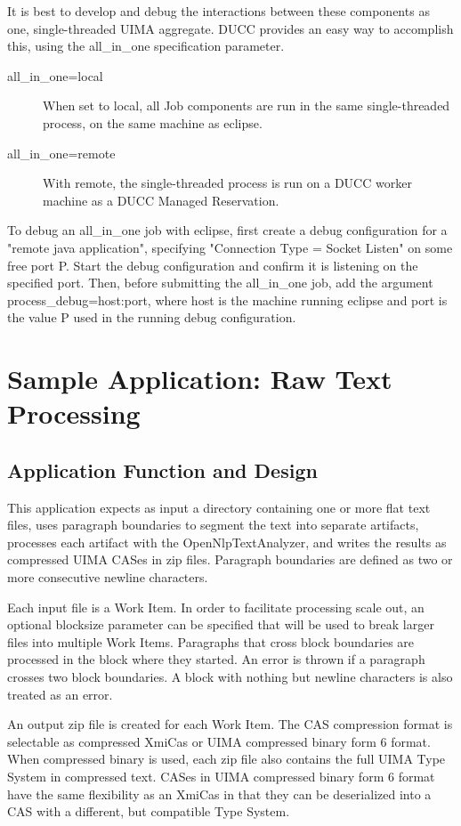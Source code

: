 It is best to develop and debug the interactions between these components as one, 
single-threaded UIMA aggregate. DUCC provides an easy way to accomplish this, using
the all\_in\_one specification parameter.

\begin{description}
    \item[all\_in\_one=local] When set to local, all Job components are run in the same
      single-threaded process, on the same machine as eclipse.
    \item[all\_in\_one=remote] With remote, the single-threaded process is run on a DUCC
      worker machine as a DUCC Managed Reservation. 
\end{description}

To debug an all\_in\_one job with eclipse, first create a debug configuration for a
"remote java application", specifying "Connection Type = Socket Listen" on some
free port P. Start the debug configuration and confirm it is listening on the specified port.
Then, before submitting the all\_in\_one job, add the argument process\_debug=host:port, 
where host is the machine running eclipse and port is
the value P used in the running debug configuration.


\chapter{Sample Application: Raw Text Processing}

\section{Application Function and Design}
This application expects as input a directory containing one or more flat text files, 
uses paragraph boundaries to segment the text into separate artifacts, 
processes each artifact with the OpenNlpTextAnalyzer, and writes
the results as compressed UIMA CASes in zip files. Paragraph boundaries are defined as
two or more consecutive newline characters.

Each input file is a Work Item. In order to facilitate processing scale out, 
an optional blocksize parameter can be specified that will be used to break larger 
files into multiple Work Items. Paragraphs that cross block boundaries are processed
in the block where they started. An error is thrown if a paragraph crosses two block
boundaries. A block with nothing but newline characters is also treated as an error.

An output zip file is created for each Work Item. The CAS compression format is selectable as
compressed XmiCas or UIMA compressed binary form 6 format. When compressed binary
is used, each zip file also contains the full UIMA Type System in compressed text.
CASes in UIMA compressed binary form 6 format have the same flexibility as an XmiCas in that
they can be deserialized into a CAS with a different, but compatible Type System.

